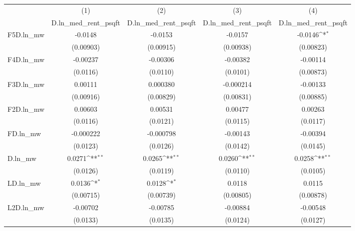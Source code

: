 {
\def\sym#1{\ifmmode^{#1}\else\(^{#1}\)\fi}
\begin{tabular}{l*{4}{c}}
\hline\hline
          &\multicolumn{1}{c}{(1)}&\multicolumn{1}{c}{(2)}&\multicolumn{1}{c}{(3)}&\multicolumn{1}{c}{(4)}\\
          &\multicolumn{1}{c}{D.ln\_med\_rent\_psqft}&\multicolumn{1}{c}{D.ln\_med\_rent\_psqft}&\multicolumn{1}{c}{D.ln\_med\_rent\_psqft}&\multicolumn{1}{c}{D.ln\_med\_rent\_psqft}\\
\hline
F5D.ln\_mw &  -0.0148         &  -0.0153         &  -0.0157         &  -0.0146\sym{*}  \\
          &(0.00903)         &(0.00915)         &(0.00938)         &(0.00823)         \\
[1em]
F4D.ln\_mw & -0.00237         & -0.00306         & -0.00382         & -0.00114         \\
          & (0.0116)         & (0.0110)         & (0.0101)         &(0.00873)         \\
[1em]
F3D.ln\_mw &  0.00111         & 0.000380         &-0.000214         & -0.00133         \\
          &(0.00916)         &(0.00829)         &(0.00831)         &(0.00885)         \\
[1em]
F2D.ln\_mw &  0.00603         &  0.00531         &  0.00477         &  0.00263         \\
          & (0.0116)         & (0.0121)         & (0.0115)         & (0.0117)         \\
[1em]
FD.ln\_mw  &-0.000222         &-0.000798         & -0.00143         & -0.00394         \\
          & (0.0123)         & (0.0126)         & (0.0142)         & (0.0145)         \\
[1em]
D.ln\_mw   &   0.0271\sym{**} &   0.0265\sym{**} &   0.0260\sym{**} &   0.0258\sym{**} \\
          & (0.0126)         & (0.0119)         & (0.0110)         & (0.0105)         \\
[1em]
LD.ln\_mw  &   0.0136\sym{*}  &   0.0128\sym{*}  &   0.0118         &   0.0115         \\
          &(0.00715)         &(0.00739)         &(0.00805)         &(0.00878)         \\
[1em]
L2D.ln\_mw & -0.00702         & -0.00785         & -0.00884         & -0.00548         \\
          & (0.0133)         & (0.0135)         & (0.0124)         & (0.0127)         \\

\end{tabular}}
